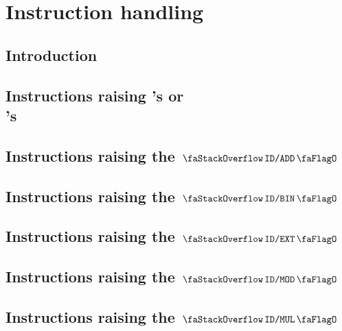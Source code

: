 

\section{Instruction handling}                                                  \label{hub: instruction handling}

\subsection{Introduction}                                                       \label{hub: instruction handling: intro}                  
\subsection{Instructions raising \suxSH's or\\ \soxSH's             \lispDone{}} \label{hub: instruction handling: sux or sox}             
\subsection{Instructions raising the $\stackDecAddFlag$           \lispDone{}}   \label{hub: instruction handling: add}                    
\subsection{Instructions raising the $\stackDecBinFlag$           \lispDone{}}   \label{hub: instruction handling: bin}                    
\subsection{Instructions raising the $\stackDecExtFlag$           \lispDone{}}   \label{hub: instruction handling: ext}                    
\subsection{Instructions raising the $\stackDecModFlag$           \lispDone{}}   \label{hub: instruction handling: mod}                    
\subsection{Instructions raising the $\stackDecMulFlag$           \lispDone{}}   \label{hub: instruction handling: mul}                    

